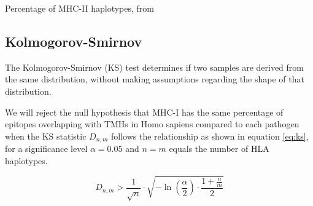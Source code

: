 \begin{table}[!htbp]
  
  \caption{
    Percentage of MHC-II haplotypes, from \cite{greenbaum2011functional}
  }
  \label{table:mhc2_haplotypes}
\end{table}

\subsection{Kolmogorov-Smirnov}

The Kolmogorov-Smirnov (KS) test determines if two samples
are derived from the same distribution, without making assumptions
regarding the shape of that distribution. 

We will reject
the null hypothesis that MHC-I has the same percentage of epitopes 
overlapping with TMHs in Homo sapiens compared to each pathogen when 
the KS statistic $D_{n,m}$ follows the relationship as shown in 
equation \ref{eq:ks}, for a significance level $\alpha = 0.05$
and $n = m$ equals the number of HLA haplotypes.

\begin{equation}
   D_{n,m} > \frac{1}{\sqrt{n}} \cdot \sqrt{ -\ln(\frac{\alpha}{2}) \cdot \frac{1 + \frac{n}{m}}{2} }
   \label{eq:ks}
\end{equation}

